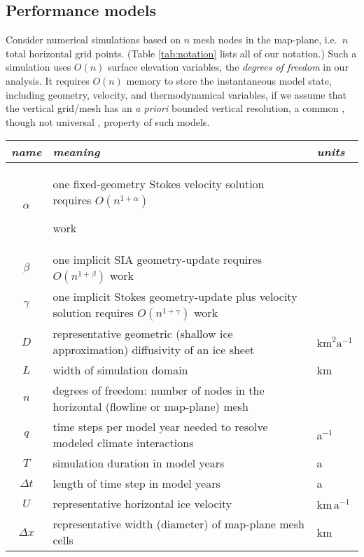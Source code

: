 \documentclass[twocolumn,letterpaper]{igs}
\begin{document}
\subsection{Performance models}

Consider numerical simulations based on $n$ mesh nodes in the map-plane, i.e.~$n$ total horizontal grid points.  (Table \ref{tab:notation} lists all of our notation.)  Such a simulation uses $O(n)$ surface elevation variables, the \emph{degrees of freedom} in our analysis.  It requires $O(n)$ memory to store the instantaneous model state, including geometry, velocity, and thermodynamical variables, if we assume that the vertical grid/mesh has an \emph{a priori} bounded vertical resolution, a common \citep[for example]{Brinkerhoffetal2017,Hoffmanetal2018}, though not universal \citep{IsaacStadlerGhattas2015}, property of such models.

\begin{table*}[ht]
\begin{tabular}{cll}
\emph{name} & \emph{meaning} & \emph{units} \\ \hline
$\alpha$    & one fixed-geometry Stokes velocity solution requires $O(n^{1+\alpha})${\large \strut} work\\
$\beta$     & one implicit SIA geometry-update requires $O(n^{1+\beta})$ work \\
$\gamma$    & one implicit Stokes geometry-update plus velocity solution requires $O(n^{1+\gamma})$ work \\
$D$         & representative geometric (shallow ice approximation) diffusivity of an ice sheet & $\text{km}^2 \text{a}^{-1}$ \\
$L$         & width of simulation domain & km \\
$n$         & degrees of freedom: number of nodes in the horizontal (flowline or map-plane) mesh \\
$q$         & time steps per model year needed to resolve modeled climate interactions & $\text{a}^{-1}$ \\
$T$         & simulation duration in model years & a \\
$\Delta t$  & length of time step in model years & a \\
$U$         & representative horizontal ice velocity & $\text{km}\,\text{a}^{-1}$ \\
$\Delta x$  & representative width (diameter) of map-plane mesh cells & km
\end{tabular}
\caption{Notation for performance modeling.  Parameters $\alpha,\beta,\gamma,n$ are pure numbers.}
\label{tab:notation}
\end{table*}
\end{document}
